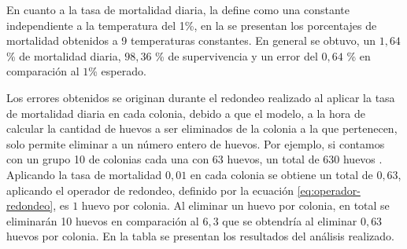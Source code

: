 En cuanto a la tasa de mortalidad diaria, \cite{otero2006stochastic} la define como una constante
independiente a la temperatura del 1\%, en la  se presentan
los porcentajes de mortalidad obtenidos a 9 temperaturas constantes. En general se obtuvo, un
$1,64$ \% de mortalidad diaria, $98,36$ \% de supervivencia y un error del $0,64$ \% en
comparación al $1$\% esperado.

Los errores obtenidos se originan durante el redondeo realizado al aplicar la tasa de mortalidad
diaria en cada colonia, debido a que el modelo, a la hora de calcular la cantidad de huevos a ser
eliminados de la colonia a la que pertenecen, solo permite eliminar a un número entero de huevos.
Por ejemplo, si contamos con un grupo 10 de colonias cada una con 63 huevos, un total de 630 huevos
. Aplicando la tasa de mortalidad $0,01$ en cada colonia se obtiene un total de $0,63$, aplicando
el operador de redondeo, definido por la ecuación \eqref{eq:operador-redondeo}, es $1$ huevo por
colonia. Al eliminar un huevo por colonia, en total se eliminarán 10 huevos en comparación al $6,3$
 que se obtendría al eliminar $0,63$ huevos por colonia. En la tabla
  se presentan los resultados del análisis realizado.
